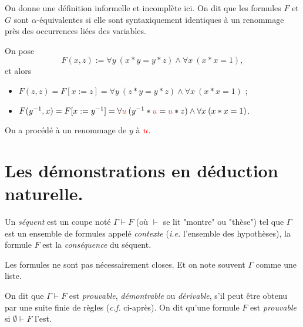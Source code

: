 \documentclass[./main]{subfiles}
\begin{document}
  \begin{defn}[Renommage]
    On donne une définition informelle et incomplète ici.
    On dit que les formules $F$ et $G$ sont $\alpha$-équivalentes si elle sont syntaxiquement identiques à un renommage près des occurrences liées des variables.
  \end{defn}

  \begin{exm}
    On pose \[
    F(x,z) := \forall y\:(x * y = y * z) \land \forall x\: (x * x = 1)
    ,\]
    et alors 
    \begin{itemize}
      \item $F(z,z) = F[x := z] = \forall y\:(z * y = y * z) \land \forall x\: (x * x = 1)$ ;
      \item $F(y^{-1}, x) = F[x := y^{-1}] = \forall {\color{nicered} u}\:(y^{-1} * {\color{nicered} u} = {\color{nicered} u} * z) \land \forall x\: (x * x = 1)$.
    \end{itemize}
    On a procédé à un renommage de $y$ à ${\color{red} u}$.
  \end{exm}

  \section{Les démonstrations en déduction naturelle.}

  \begin{defn}
    Un \textit{séquent} est un coupe noté $\Gamma \vdash F$ (où $\vdash $ se lit "montre" ou "thèse") tel que $\Gamma$ est un ensemble de formules appelé \textit{contexte} (\textit{i.e.} l'ensemble des hypothèses), la formule $F$ est la \textit{conséquence} du séquent.
  \end{defn}

  \begin{rmk}
    Les formules ne sont pas nécessairement closes. Et on note souvent $\Gamma$ comme une liste.
  \end{rmk}

  \begin{defn}
    On dit que $\Gamma \vdash F$ est \textit{prouvable}, \textit{démontrable} ou \textit{dérivable}, s'il peut être obtenu par une suite finie de règles (\textit{c.f.} ci-après).
    On dit qu'une formule $F$ est \textit{prouvable} si $\emptyset\vdash F$ l'est.
  \end{defn}
\end{document}
